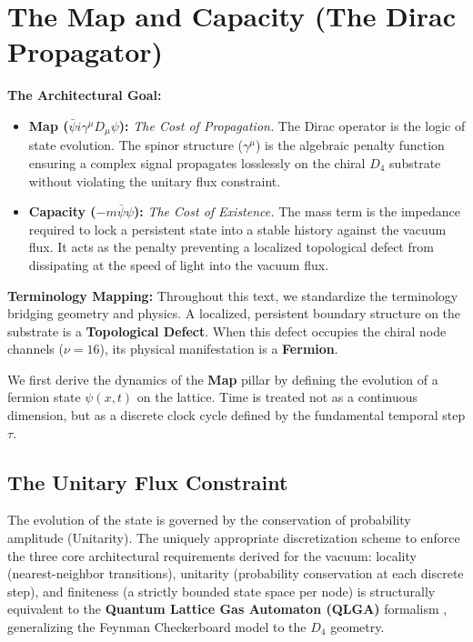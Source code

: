 \section{The Map and Capacity (The Dirac Propagator)}
\label{sec:map}

\textbf{The Architectural Goal:} 
\begin{itemize}
    \item \textbf{Map ($\bar{\psi} i \gamma^\mu D_\mu \psi$):} \textit{The Cost of Propagation.} The Dirac operator is the logic of state evolution. The spinor structure ($\gamma^\mu$) is the algebraic penalty function ensuring a complex signal propagates losslessly on the chiral $D_4$ substrate without violating the unitary flux constraint.
    \item \textbf{Capacity ($-m\bar{\psi}\psi$):} \textit{The Cost of Existence.} The mass term is the impedance required to lock a persistent state into a stable history against the vacuum flux. It acts as the penalty preventing a localized topological defect from dissipating at the speed of light into the vacuum flux.
\end{itemize}

\textbf{Terminology Mapping:} Throughout this text, we standardize the terminology bridging geometry and physics. A localized, persistent boundary structure on the substrate is a \textbf{Topological Defect}. When this defect occupies the chiral node channels ($\nu=16$), its physical manifestation is a \textbf{Fermion}. 

We first derive the dynamics of the \textbf{Map} pillar by defining the evolution of a fermion state $\psi(x,t)$ on the lattice. Time is treated not as a continuous dimension, but as a discrete clock cycle defined by the fundamental temporal step $\tau$.

\subsection{The Unitary Flux Constraint}
The evolution of the state is governed by the conservation of probability amplitude (Unitarity). The uniquely appropriate discretization scheme to enforce the three core architectural requirements derived for the vacuum: locality (nearest-neighbor transitions), unitarity (probability conservation at each discrete step), and finiteness (a strictly bounded state space per node) is structurally equivalent to the \textbf{Quantum Lattice Gas Automaton (QLGA)} formalism \cite{meyer_quantum_1996}, generalizing the Feynman Checkerboard model\cite{feynman_quantum_1965} to the $D_4$ geometry.

